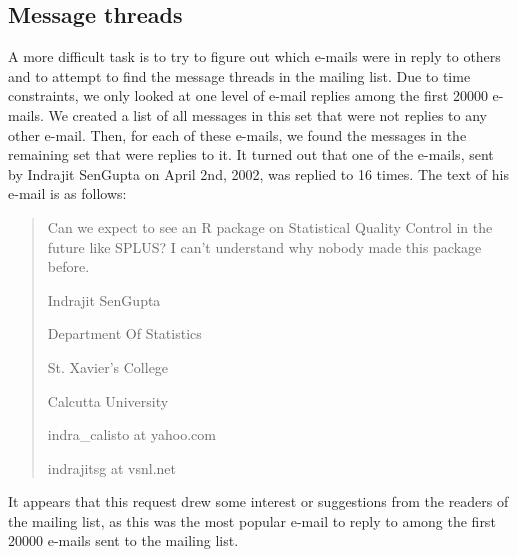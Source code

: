 \documentclass[12pt, a4paper, oneside]{amsart}
\begin{document}
\subsection{Message threads}

A more difficult task is to try to figure out which e-mails were in reply to others and to attempt to find the message threads in the mailing list.  Due to time constraints, we only looked at one level of e-mail replies among the first 20000 e-mails.  We created a list of all messages in this set that were not replies to any other e-mail.  Then, for each of these e-mails, we found the messages in the remaining set that were replies to it.  It turned out that one of the e-mails, sent by Indrajit SenGupta on April 2nd, 2002, was replied to 16 times.  The text of his e-mail is as follows:

\begin{quote}
Can we expect to see an R package on Statistical Quality Control in the      
future like SPLUS? I can't understand why nobody made this package before.    
                                                                             
                                                       
Indrajit SenGupta     
                                                        
Department Of Statistics   
                                                  
St. Xavier's College   
                                                        
Calcutta University  
                                                          
indra\_calisto at yahoo.com   
                                                  
indrajitsg at vsnl.net   
                                                                                                                                   
\end{quote}

It appears that this request drew some interest or suggestions from the readers of the mailing list, as this was the most popular e-mail to reply to among the first 20000 e-mails sent to the mailing list.

\newpage
\end{document}
